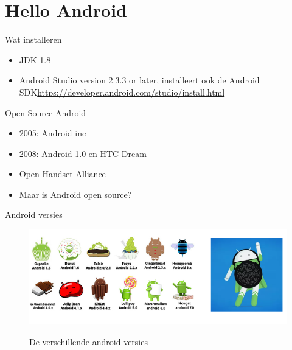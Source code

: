 \documentclass{beamer}
\begin{document}
\section{Hello Android}
\sectionframe{}

\begin{frame}{Wat installeren}
\begin{itemize}

	\item JDK 1.8
	\item Android Studio version 2.3.3 or later, installeert ook de Android SDK\break \url{https://developer.android.com/studio/install.html}
		\end{itemize}	

\end{frame}
\begin{frame}{Open Source Android}
\begin{itemize}
	
	\item 2005: Android inc
	\item 2008: Android 1.0 en HTC Dream
	\item Open Handset Alliance
	\item Maar is Android  open source?
\end{itemize}	

\end{frame}
\begin{frame}{Android versies }
\begin{figure}[ht]
	\centering
	\includegraphics[width=\textwidth]{img/hello/android_versies.png}
	\label{fig:android versies}
	\caption{De verschillende android versies}
\end{figure}	
\end{frame}
\end{document}
